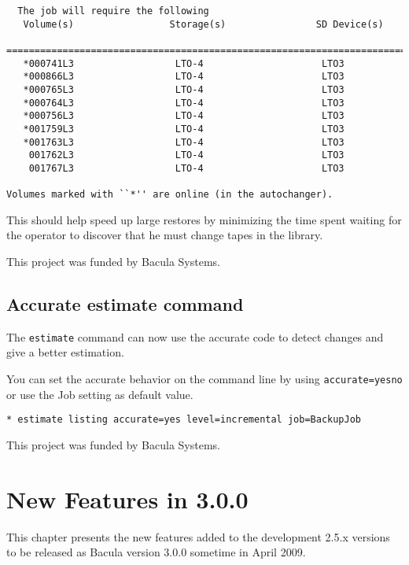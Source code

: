 \begin{verbatim}
  The job will require the following
   Volume(s)                 Storage(s)                SD Device(s)
   ===========================================================================
   *000741L3                  LTO-4                     LTO3 
   *000866L3                  LTO-4                     LTO3 
   *000765L3                  LTO-4                     LTO3 
   *000764L3                  LTO-4                     LTO3 
   *000756L3                  LTO-4                     LTO3 
   *001759L3                  LTO-4                     LTO3 
   *001763L3                  LTO-4                     LTO3 
    001762L3                  LTO-4                     LTO3 
    001767L3                  LTO-4                     LTO3 

Volumes marked with ``*'' are online (in the autochanger).
\end{verbatim}

This should help speed up large restores by minimizing the time spent
waiting for the operator to discover that he must change tapes in the library.

This project was funded by Bacula Systems.

\section{Accurate estimate command}

The \texttt{estimate} command can now use the accurate code to detect changes
and give a better estimation.

You can set the accurate behavior on the command line by using
\texttt{accurate=yes\vb{}no} or use the Job setting as default value.

\begin{verbatim}
* estimate listing accurate=yes level=incremental job=BackupJob
\end{verbatim}

This project was funded by Bacula Systems.

\chapter{New Features in 3.0.0}
\label{NewFeaturesChapter}

This chapter presents the new features added to the development 2.5.x
versions to be released as Bacula version 3.0.0 sometime in April 2009.

